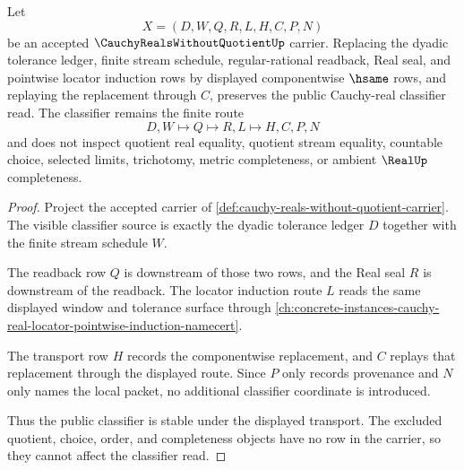 \begin{theorem}
\label{thm:cauchy-reals-without-quotient-classifier-stability}
Let
$$
X=(D,W,Q,R,L,H,C,P,N)
$$
be an accepted $\CauchyRealsWithoutQuotientUp$ carrier. Replacing the dyadic tolerance ledger, finite stream schedule, regular-rational readback, Real seal, and pointwise locator induction rows by displayed componentwise $\hsame$ rows, and replaying the replacement through $C$, preserves the public Cauchy-real classifier read. The classifier remains the finite route
$$
D,W \longmapsto Q \longmapsto R,L \longmapsto H,C,P,N
$$
and does not inspect quotient real equality, quotient stream equality, countable choice, selected limits, trichotomy, metric completeness, or ambient $\RealUp$ completeness.
\end{theorem}
\begin{proof}
Project the accepted carrier of \autoref{def:cauchy-reals-without-quotient-carrier}. The visible classifier source is exactly the dyadic tolerance ledger $D$ together with the finite stream schedule $W$.

The readback row $Q$ is downstream of those two rows, and the Real seal $R$ is downstream of the readback. The locator induction route $L$ reads the same displayed window and tolerance surface through \autoref{ch:concrete-instances-cauchy-real-locator-pointwise-induction-namecert}.

The transport row $H$ records the componentwise replacement, and $C$ replays that replacement through the displayed route. Since $P$ only records provenance and $N$ only names the local packet, no additional classifier coordinate is introduced.

Thus the public classifier is stable under the displayed transport. The excluded quotient, choice, order, and completeness objects have no row in the carrier, so they cannot affect the classifier read.
\end{proof}

